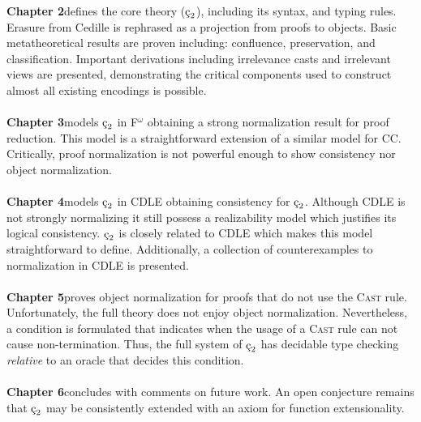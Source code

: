 \textbf{Chapter 2}\quad defines the core theory ($\ced$), including its syntax, and typing rules.
Erasure from Cedille is rephrased as a projection from proofs to objects.
Basic metatheoretical results are proven including: confluence, preservation, and classification.
Important derivations including irrelevance casts and irrelevant views are presented, demonstrating the critical components used to construct almost all existing encodings is possible.
\\ \\
\textbf{Chapter 3}\quad models $\ced$ in F$^\omega$ obtaining a strong normalization result for proof reduction.
This model is a straightforward extension of a similar model for CC.
Critically, proof normalization is not powerful enough to show consistency nor object normalization.
\\ \\
\textbf{Chapter 4}\quad models $\ced$ in CDLE obtaining consistency for $\ced$.
Although CDLE is not strongly normalizing it still possess a realizability model which justifies its logical consistency.
$\ced$ is closely related to CDLE which makes this model straightforward to define.
Additionally, a collection of counterexamples to normalization in CDLE is presented.
\\ \\
\textbf{Chapter 5}\quad proves object normalization for proofs that do not use the \textsc{Cast} rule.
Unfortunately, the full theory does not enjoy object normalization.
Nevertheless, a condition is formulated that indicates when the usage of a \textsc{Cast} rule can not cause non-termination.
Thus, the full system of $\ced$ has decidable type checking \textit{relative} to an oracle that decides this condition.
\\ \\
\textbf{Chapter 6}\quad concludes with comments on future work.
An open conjecture remains that $\ced$ may be consistently extended with an axiom for function extensionality.
